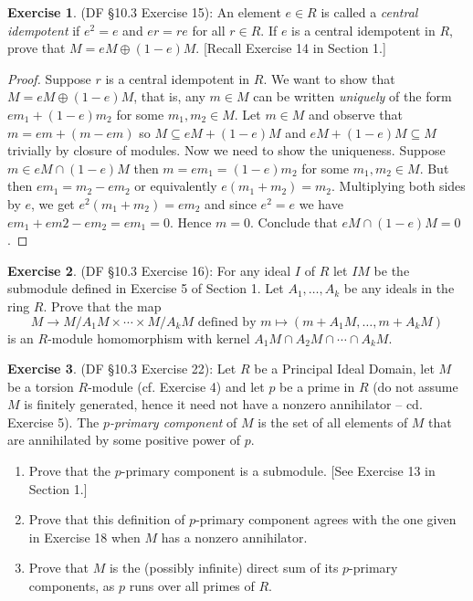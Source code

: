 \documentclass[8pt]{amsart}
\theoremstyle{plain}%
\theoremstyle{definition}
\newtheorem*{exercise}{Exercise}%
\theoremstyle{remark}
\numberwithin{equation}{section}
\begin{document}
\begin{exercise}
(DF \S 10.3 Exercise 15): An element $e \in R$ is called a \textit{central idempotent} if $e^2 = e$ and $er = re$ for all $r \in R$. If $e$ is a central idempotent in $R$, prove that $M = eM \oplus (1 - e)M$. [Recall Exercise 14 in Section 1.]
	\begin{proof}
		Suppose $r$ is a central idempotent in $R$. We want to show that $M = eM \oplus (1 - e)M$, that is, any $m \in M$ can be written \textit{uniquely} of the form $em_1 + (1 - e)m_2$ for some $m_1, m_2 \in M$. Let $m \in M$ and observe that $m = em + (m - em)$ so $M \subseteq eM + (1 - e)M$ and $eM + (1 - e)M \subseteq M$ trivially by closure of modules. Now we need to show the uniqueness. Suppose $m \in eM \cap (1 - e)M$ then $m = em_1 = (1 - e)m_2$ for some $m_1, m_2 \in M$. But then $em_1 = m_2 - em_2$ or equivalently $e(m_1 + m_2) = m_2$. Multiplying both sides by $e$, we get $e^2(m_1 + m_2) = em_2$ and since $e^2 = e$ we have $em_1 + em2 - em_2 = em_1 = 0$. Hence $m = 0$. Conclude that $eM \cap (1 - e)M = 0$.
	\end{proof}
\end{exercise}

\begin{exercise}
(DF \S 10.3 Exercise 16): For any ideal $I$ of $R$ let $IM$ be the submodule defined in Exercise 5 of Section 1. Let $A_1, \ldots, A_k$ be any ideals in the ring $R$. Prove that the map $$M \to M/A_1M \times \cdots \times M/A_kM \text{ defined by } m \mapsto (m + A_1M, \ldots, m + A_kM)$$ is an $R$-module homomorphism with kernel $A_1M \cap A_2M \cap \cdots \cap A_kM$.
\end{exercise}

\begin{exercise}
(DF \S 10.3 Exercise 22): Let $R$ be a Principal Ideal Domain, let $M$ be a torsion $R$-module (cf. Exercise 4) and let $p$ be a prime in $R$ (do not assume $M$ is finitely generated, hence it need not have a nonzero annihilator -- cd. Exercise 5). The \textit{$p$-primary component} of $M$ is the set of all elements of $M$ that are annihilated by some positive power of $p$.
	\begin{enumerate}
		\item Prove that the $p$-primary component is a submodule. [See Exercise 13 in Section 1.]
		\item Prove that this definition of $p$-primary component agrees with the one given in Exercise 18 when $M$ has a nonzero annihilator.
		\item Prove that $M$ is the (possibly infinite) direct sum of its $p$-primary components, as $p$ runs over all primes of $R$.
	\end{enumerate}
\end{exercise}
\end{document}
